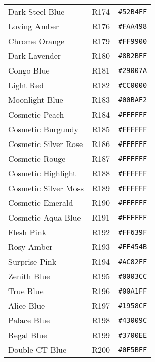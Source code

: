 \documentclass[a4paper]{article}
\begin{document}
\begin{longtable}{|l|l|r|}
Dark Steel Blue & R174 & \texttt{\#52B4FF} \cellcolor[HTML]{52B4FF} \\
Loving Amber & R176 & \texttt{\#FAA498} \cellcolor[HTML]{FAA498} \\
Chrome Orange & R179 & \texttt{\#FF9900} \cellcolor[HTML]{FF9900} \\
Dark Lavender & R180 & \texttt{\#8B2BFF} \cellcolor[HTML]{8B2BFF} \\
Congo Blue & R181 & \texttt{\#29007A} \cellcolor[HTML]{29007A} \\
Light Red & R182 & \texttt{\#CC0000} \cellcolor[HTML]{CC0000} \\
Moonlight Blue & R183 & \texttt{\#00BAF2} \cellcolor[HTML]{00BAF2} \\
Cosmetic Peach & R184 & \texttt{\#FFFFFF} \cellcolor[HTML]{FFFFFF} \\
Cosmetic Burgundy & R185 & \texttt{\#FFFFFF} \cellcolor[HTML]{FFFFFF} \\
Cosmetic Silver Rose & R186 & \texttt{\#FFFFFF} \cellcolor[HTML]{FFFFFF} \\
Cosmetic Rouge & R187 & \texttt{\#FFFFFF} \cellcolor[HTML]{FFFFFF} \\
Cosmetic Highlight & R188 & \texttt{\#FFFFFF} \cellcolor[HTML]{FFFFFF} \\
Cosmetic Silver Moss & R189 & \texttt{\#FFFFFF} \cellcolor[HTML]{FFFFFF} \\
Cosmetic Emerald & R190 & \texttt{\#FFFFFF} \cellcolor[HTML]{FFFFFF} \\
Cosmetic Aqua Blue & R191 & \texttt{\#FFFFFF} \cellcolor[HTML]{FFFFFF} \\
Flesh Pink & R192 & \texttt{\#FF639F} \cellcolor[HTML]{FF639F} \\
Rosy Amber & R193 & \texttt{\#FF454B} \cellcolor[HTML]{FF454B} \\
Surprise Pink & R194 & \texttt{\#AC82FF} \cellcolor[HTML]{AC82FF} \\
Zenith Blue & R195 & \texttt{\#0003CC} \cellcolor[HTML]{0003CC} \\
True Blue & R196 & \texttt{\#00A1FF} \cellcolor[HTML]{00A1FF} \\
Alice Blue & R197 & \texttt{\#1958CF} \cellcolor[HTML]{1958CF} \\
Palace Blue & R198 & \texttt{\#43009C} \cellcolor[HTML]{43009C} \\
Regal Blue & R199 & \texttt{\#3700EE} \cellcolor[HTML]{3700EE} \\
Double CT Blue & R200 & \texttt{\#0F5BFF} \cellcolor[HTML]{0F5BFF} \\

\end{longtable}
\end{document}
